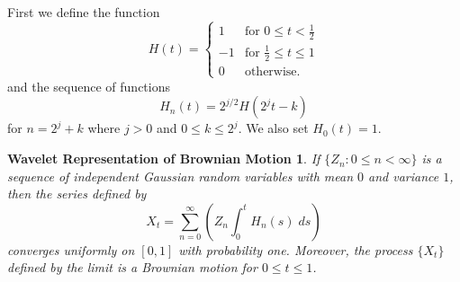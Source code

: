\documentclass[12pt]{article}
\begin{document}
First we define the function
\begin{equation}
H(t) =
  \begin{cases}
    1 & \text{for } 0 \leq t < \tfrac{1}{2} \\
    -1 & \text{for } \tfrac{1}{2} \leq t \leq 1 \\
    0 & \text{otherwise.}
  \end{cases}
\end{equation}
and the sequence of functions
\begin{equation}
H_n(t) = 2^{j/2}H(2^j t - k) \end{equation} for $n=2^j+k$ where $j>0$ and $0\leq k \leq 2^j$.  We also set $H_0(t)=1$.
\newtheorem*{thm}{Wavelet Representation of Brownian Motion}
\begin{thm}
If $\{Z_n:0\leq n < \infty \}$ is a sequence of independent Gaussian random variables with mean
$0$ and variance $1$, then the series defined by
\begin{equation}
X_t = \sum^{\infty}_{n=0} \left(Z_n \int_0^t H_n(s)\;ds\right)
\end{equation}
converges uniformly on $[0,1]$ with probability one.  Moreover, the process $\{X_t\}$ defined by
the limit is a \emph{Brownian motion} for $0 \leq t \leq 1$.
\end{thm}
\end{document}
